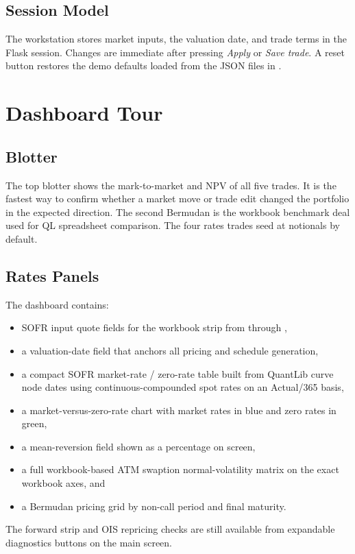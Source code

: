 \documentclass[11pt]{article}
\begin{document}
\subsection{Session Model}
The workstation stores market inputs, the valuation date, and trade terms in the Flask session. Changes are immediate after pressing \emph{Apply} or \emph{Save trade}. A reset button restores the demo defaults loaded from the JSON files in .

\section{Dashboard Tour}
\subsection{Blotter}
The top blotter shows the mark-to-market and NPV of all five trades. It is the fastest way to confirm whether a market move or trade edit changed the portfolio in the expected direction. The second Bermudan is the workbook benchmark deal used for QL spreadsheet comparison. The four rates trades seed at  notionals by default.

\subsection{Rates Panels}
The dashboard contains:
\begin{itemize}[leftmargin=1.5em]
    \item SOFR input quote fields for the workbook strip from  through ,
    \item a valuation-date field that anchors all pricing and schedule generation,
    \item a compact SOFR market-rate / zero-rate table built from QuantLib curve node dates using continuous-compounded spot rates on an Actual/365 basis,
    \item a market-versus-zero-rate chart with market rates in blue and zero rates in green,
    \item a mean-reversion field shown as a percentage on screen,
    \item a full workbook-based ATM swaption normal-volatility matrix on the exact workbook axes, and
    \item a Bermudan pricing grid by non-call period and final maturity.
\end{itemize}
The forward strip and OIS repricing checks are still available from expandable diagnostics buttons on the main screen.
\end{document}
